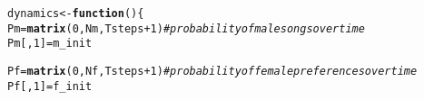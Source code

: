 \documentclass{article}\usepackage[]{graphicx}\usepackage[]{color}
\makeatletter
\newcommand{\hlnum}[1]{\textcolor[rgb]{0.686,0.059,0.569}{#1}}%
\newcommand{\hlcom}[1]{\textcolor[rgb]{0.678,0.584,0.686}{\textit{#1}}}%
\newcommand{\hlopt}[1]{\textcolor[rgb]{0,0,0}{#1}}%
\newcommand{\hlstd}[1]{\textcolor[rgb]{0.345,0.345,0.345}{#1}}%
\newcommand{\hlkwa}[1]{\textcolor[rgb]{0.161,0.373,0.58}{\textbf{#1}}}%
\newcommand{\hlkwb}[1]{\textcolor[rgb]{0.69,0.353,0.396}{#1}}%
\newcommand{\hlkwd}[1]{\textcolor[rgb]{0.737,0.353,0.396}{\textbf{#1}}}%
\newenvironment{kframe}{%
 \def\at@end@of@kframe{}%
 \ifinner\ifhmode%
  \def\at@end@of@kframe{\end{minipage}}%
  \begin{minipage}{\columnwidth}%
 \fi\fi%
 \def\FrameCommand##1{\hskip\@totalleftmargin \hskip-\fboxsep
 \colorbox{shadecolor}{##1}\hskip-\fboxsep
     \hskip-\linewidth \hskip-\@totalleftmargin \hskip\columnwidth}%
 \MakeFramed {\advance\hsize-\width
   \@totalleftmargin\z@ \linewidth\hsize
   \@setminipage}}%
 {\par\unskip\endMakeFramed%
 \at@end@of@kframe}
\newenvironment{knitrout}{}{} %
\makeatother
\begin{document}
\vspace{.1 in}

\begin{knitrout}
\color{fgcolor}\begin{kframe}
\begin{alltt}
\hlstd{dynamics} \hlkwb{<-}\hlkwa{function}\hlstd{()\{}
\hlstd{Pm} \hlkwb{=} \hlkwd{matrix}\hlstd{(}\hlnum{0}\hlstd{,Nm,Tsteps}\hlopt{+}\hlnum{1}\hlstd{)} \hlcom{#probability of male songs over time}
\hlstd{Pm[,}\hlnum{1}\hlstd{]} \hlkwb{=} \hlstd{m_init}

\hlstd{Pf} \hlkwb{=} \hlkwd{matrix}\hlstd{(}\hlnum{0}\hlstd{,Nf,Tsteps}\hlopt{+}\hlnum{1}\hlstd{)} \hlcom{#probability of female preferences over time}
\hlstd{Pf[,}\hlnum{1}\hlstd{]} \hlkwb{=} \hlstd{f_init}


\end{alltt}
\end{kframe}
\end{knitrout}
\end{document}
